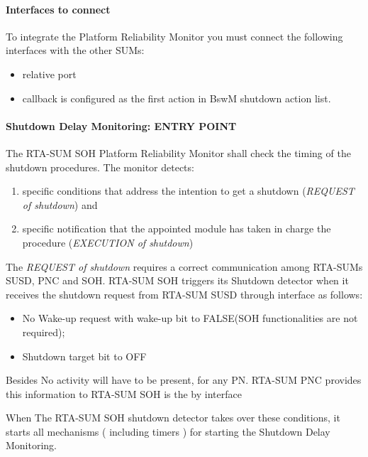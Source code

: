 \paragraph{Interfaces to connect}
To integrate the Platform Reliability Monitor you must connect the following interfaces with the other SUMs:

\begin{itemize}
\item {} relative port
\item {} callback is configured as the first action in BswM shutdown action list.
\end{itemize}

\paragraph{Shutdown Delay Monitoring: ENTRY POINT}\label{sec:shutdownEntryPoint}
The RTA-SUM SOH Platform Reliability Monitor shall check the timing of the shutdown procedures. 
The monitor detects:

\begin{enumerate}
	\item specific conditions that address the intention to get a shutdown (\textit{REQUEST of shutdown}) and
	\item specific notification that the appointed module has taken in charge the procedure (\textit{EXECUTION of shutdown})
\end{enumerate}

The \textit{REQUEST of shutdown} requires a correct communication among RTA-SUMs SUSD, PNC and SOH. RTA-SUM SOH triggers its Shutdown detector when it receives the shutdown request from RTA-SUM SUSD through  interface as follows:

\begin{itemize}
	\item No Wake-up request with wake-up bit to FALSE(SOH functionalities are not required);
	\item Shutdown target bit to OFF
\end{itemize}

Besides No activity will have to be present, for any PN. RTA-SUM PNC provides this information to RTA-SUM SOH is the  by interface 

When The RTA-SUM SOH shutdown detector takes over these conditions, it starts all mechanisms ( including timers ) for starting the Shutdown Delay Monitoring. 

